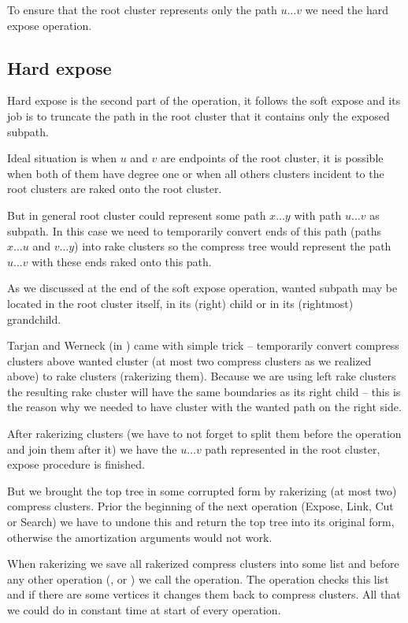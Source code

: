To ensure that the root cluster represents only the path $u\dots v$ we need the
hard expose operation.

\subsection{Hard expose}

Hard expose is the second part of the \Expose{} operation, it follows the soft
expose and its job is to truncate the path in the root cluster that it contains
only the exposed subpath.

Ideal situation is when $u$ and $v$ are endpoints of the root cluster, it is
possible when both of them have degree one or when all others clusters incident
to the root clusters are raked onto the root cluster.

But in general root cluster could represent some path $x\dots y$ with path $u\dots v$
as subpath. In this case we need to temporarily convert ends of this path (paths
$x\dots u$ and $v\dots y$) into rake clusters so the compress tree would represent the
path $u\dots v$ with these ends raked onto this path.

As we discussed at the end of the soft expose operation, wanted subpath may be
located in the root cluster itself, in its (right) child or in its (rightmost)
grandchild.

Tarjan and Werneck (in \cite{SelfAdjustingTT}) came with simple trick -- temporarily
convert compress clusters above wanted cluster (at most two compress clusters as
we realized above) to rake clusters ({\I rakerizing} them). Because we are using
left rake clusters the resulting rake cluster will have the same boundaries as
its right child -- this is the reason why we needed to have cluster with the
wanted path on the right side.

After rakerizing clusters (we have to not forget to split them before the
operation and join them after it) we have the $u\dots v$ path represented in
the root cluster, expose procedure is finished.

But we brought the top tree in some corrupted form by rakerizing (at most two)
compress clusters. Prior the beginning of the next operation (Expose, Link, Cut
or Search) we have to undone this and return the top tree into its original
form, otherwise the amortization arguments would not work.

When rakerizing we save all rakerized compress clusters into some list and
before any other operation (\Cut, \Link or \Expose) we call the \Restore{} operation.
The \Restore{} operation checks this list and if there are some vertices it changes
them back to compress clusters. All that we could do in constant time at start
of every operation.

